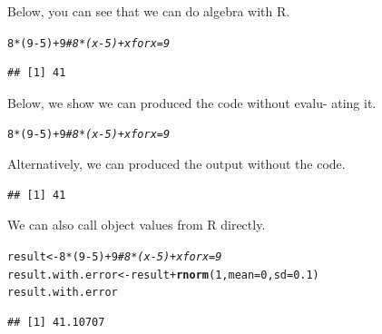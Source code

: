 \documentclass{article}\usepackage[]{graphicx}\usepackage[]{xcolor}
\makeatletter
\newcommand{\hlnum}[1]{\textcolor[rgb]{0.686,0.059,0.569}{#1}}%
\newcommand{\hlcom}[1]{\textcolor[rgb]{0.678,0.584,0.686}{\textit{#1}}}%
\newcommand{\hlopt}[1]{\textcolor[rgb]{0,0,0}{#1}}%
\newcommand{\hldef}[1]{\textcolor[rgb]{0.345,0.345,0.345}{#1}}%
\newcommand{\hlkwb}[1]{\textcolor[rgb]{0.69,0.353,0.396}{#1}}%
\newcommand{\hlkwc}[1]{\textcolor[rgb]{0.333,0.667,0.333}{#1}}%
\newcommand{\hlkwd}[1]{\textcolor[rgb]{0.737,0.353,0.396}{\textbf{#1}}}%
\newenvironment{kframe}{%
 \def\at@end@of@kframe{}%
 \ifinner\ifhmode%
  \def\at@end@of@kframe{\end{minipage}}%
  \begin{minipage}{\columnwidth}%
 \fi\fi%
 \def\FrameCommand##1{\hskip\@totalleftmargin \hskip-\fboxsep
 \colorbox{shadecolor}{##1}\hskip-\fboxsep
     \hskip-\linewidth \hskip-\@totalleftmargin \hskip\columnwidth}%
 \MakeFramed {\advance\hsize-\width
   \@totalleftmargin\z@ \linewidth\hsize
   \@setminipage}}%
 {\par\unskip\endMakeFramed%
 \at@end@of@kframe}
\newenvironment{knitrout}{}{} %
\makeatother
\begin{document}
\begin{multicols}{2}
Below, you can see that we can do algebra with R.
\begin{knitrout}\scriptsize
{}\color{fgcolor}\begin{kframe}
\begin{alltt}
\hlnum{8}\hlopt{*}\hldef{(}\hlnum{9}\hlopt{-}\hlnum{5}\hldef{)} \hlopt{+} \hlnum{9} \hlcom{# 8*(x-5)+x for x=9}
\end{alltt}
\begin{verbatim}
## [1] 41
\end{verbatim}
\end{kframe}
\end{knitrout}

Below, we show we can produced the code without evalu- ating it.
\begin{knitrout}\scriptsize
{}\color{fgcolor}\begin{kframe}
\begin{alltt}
\hlnum{8}\hlopt{*}\hldef{(}\hlnum{9}\hlopt{-}\hlnum{5}\hldef{)} \hlopt{+} \hlnum{9} \hlcom{# 8*(x-5)+x for x=9}
\end{alltt}
\end{kframe}
\end{knitrout}

Alternatively, we can produced the output without the code.
\begin{knitrout}\scriptsize
{}\color{fgcolor}\begin{kframe}
\begin{verbatim}
## [1] 41
\end{verbatim}
\end{kframe}
\end{knitrout}

We can also call object values from R directly.
\begin{knitrout}\scriptsize
{}\color{fgcolor}\begin{kframe}
\begin{alltt}
\hldef{result} \hlkwb{<-} \hlnum{8}\hlopt{*}\hldef{(}\hlnum{9}\hlopt{-}\hlnum{5}\hldef{)} \hlopt{+} \hlnum{9} \hlcom{# 8*(x-5)+x for x=9}
\hldef{result.with.error} \hlkwb{<-} \hldef{result} \hlopt{+} \hlkwd{rnorm}\hldef{(}\hlnum{1}\hldef{,} \hlkwc{mean} \hldef{=} \hlnum{0}\hldef{,} \hlkwc{sd} \hldef{=} \hlnum{0.1}\hldef{)}
\hldef{result.with.error}
\end{alltt}
\begin{verbatim}
## [1] 41.10707
\end{verbatim}
\end{kframe}
\end{knitrout}


\end{multicols}
\end{document}
